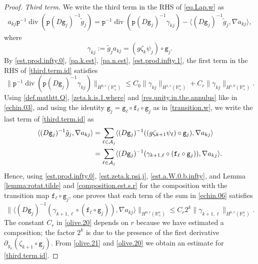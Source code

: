 \documentclass[10pt,reqno,a4paper]{article}
\numberwithin{equation}{section}
\theoremstyle{plain}
\theoremstyle{definition}
\newcommand{\R}{{\mathbb R}}
\newcommand{\mA}{\mathcal{A}}
\newcommand{\la}{\langle}
\newcommand{\ra}{\rangle}
\newcommand{\pa}{\partial}
\newcommand{\grad}{\nabla}
\DeclareMathOperator{\divergence}{div}
\begin{document}
\begin{proof}
\emph{Third term.} We write the third term in the RHS of \eqref{eq.Lap.w} as 
\begin{align}
a_{kj} \mathtt p^{-1} \divergence (\mathtt p (D \mathtt g_j)^{-1} \tilde g_j) 
= \mathtt p^{-1} \divergence (\mathtt p (D \mathtt g_j)^{-1} \gamma_{kj}) 
- \la (D \mathtt g_j)^{-1} \tilde g_j , \grad a_{kj} \ra,
\label{third.term.id}
\end{align}
where 
\begin{equation} \label{def.gamma.nkj}
\gamma_{kj} := \tilde g_j a_{kj} 
= (g \zeta_k \psi_j) \circ \mathtt g_j.
\end{equation}
By \eqref{est.prod.infty.0}, \eqref{pa.k.est}, \eqref{pa.n.est}, 
\eqref{est.prod.infty.1}, the first term in the RHS of \eqref{third.term.id} satisfies 
\begin{equation}  \label{olive.21}
\| \mathtt p^{-1} \divergence (\mathtt p (D \mathtt g_j)^{-1} \gamma_{kj}) \|_{H^{0,r}(\R^n_+)} 
\leq C_0 \| \gamma_{kj} \|_{H^{1,r}(\R^n_+)} + C_r \| \gamma_{kj} \|_{H^{1,0}(\R^n_+)}.
\end{equation}
Using \eqref{def.mathtt.Q}, \eqref{zeta.k.is.1.where} and \eqref{res.unity.in.the.annulus} 
like in \eqref{echin.03}, and using the identity 
$\mathtt g_j = \mathtt g_\ell \circ \mathtt f_\ell \circ \mathtt g_j$ as in \eqref{transition.w},
we write the last term of \eqref{third.term.id} as 
\begin{align}
\la (D \mathtt g_j)^{-1} \tilde g_j , \grad a_{kj} \ra
& = \sum_{\ell \in \mA_j} 
\la (D \mathtt g_j)^{-1} ((g \zeta_{k+1} \psi_\ell) \circ \mathtt g_j) , \grad a_{kj} \ra
\notag \\
& = \sum_{\ell \in \mA_j} 
\la (D \mathtt g_j)^{-1} (\gamma_{k+1, \ell} \circ (\mathtt f_\ell \circ \mathtt g_j)) , \grad a_{kj} \ra.
\label{echin.06}
\end{align}
Hence, using \eqref{est.prod.infty.0}, 
\eqref{est.zeta.k.psi.j}, 
\eqref{est.a.W.0.b.infty}, 
and Lemma \ref{lemma:rotat.tilde} and \eqref{composition.est.s.r} 
for the composition with the transition map $\mathtt f_\ell \circ \mathtt g_j$,
one proves that each term of the sum in \eqref{echin.06} satisfies 
\begin{equation} \label{olive.20}
\| \la (D \mathtt g_j)^{-1} (\gamma_{k+1, \ell} \circ (\mathtt f_\ell \circ \mathtt g_j)) , 
\grad a_{kj} \ra \|_{H^{0,r}(\R^n_+)} 
\leq C_r 2^k \| \gamma_{k+1, \ell} \|_{H^{0,r}(\R^n_+)}.
\end{equation}
The constant $C_r$ in \eqref{olive.20} depends on $r$ 
because we have estimated a composition; 
the factor $2^k$ is due to the presence 
of the first derivative $\pa_{y_n} (\zeta_{k+1} \circ \mathtt g_j)$.  
From \eqref{olive.21} and \eqref{olive.20} we obtain an estimate for \eqref{third.term.id}.



\end{proof}
\end{document}
